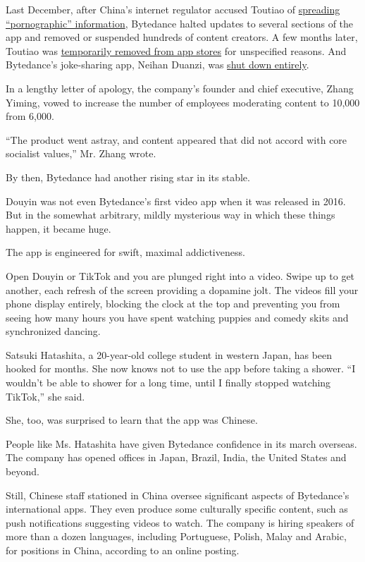 Last December, after China's internet regulator accused Toutiao of
\href{https://www.nytimes3xbfgragh.onion/2018/01/02/business/china-toutiao-censorship.html}{spreading
``pornographic'' information}, Bytedance halted updates to several
sections of the app and removed or suspended hundreds of content
creators. A few months later, Toutiao was
\href{https://www.nytimes3xbfgragh.onion/2018/04/11/technology/china-toutiao-bytedance-censor.html}{temporarily
removed from app stores} for unspecified reasons. And Bytedance's
joke-sharing app, Neihan Duanzi, was
\href{https://www.nytimes3xbfgragh.onion/2018/04/12/business/china-bytedance-duanzi-censor.html}{shut
down entirely}.

In a lengthy letter of apology, the company's founder and chief
executive, Zhang Yiming, vowed to increase the number of employees
moderating content to 10,000 from 6,000.

``The product went astray, and content appeared that did not accord with
core socialist values,'' Mr. Zhang wrote.

By then, Bytedance had another rising star in its stable.

Douyin was not even Bytedance's first video app when it was released in
2016. But in the somewhat arbitrary, mildly mysterious way in which
these things happen, it became huge.

The app is engineered for swift, maximal addictiveness.

Open Douyin or TikTok and you are plunged right into a video. Swipe up
to get another, each refresh of the screen providing a dopamine jolt.
The videos fill your phone display entirely, blocking the clock at the
top and preventing you from seeing how many hours you have spent
watching puppies and comedy skits and synchronized dancing.

Satsuki Hatashita, a 20-year-old college student in western Japan, has
been hooked for months. She now knows not to use the app before taking a
shower. ``I wouldn't be able to shower for a long time, until I finally
stopped watching TikTok,'' she said.

She, too, was surprised to learn that the app was Chinese.

People like Ms. Hatashita have given Bytedance confidence in its march
overseas. The company has opened offices in Japan, Brazil, India, the
United States and beyond.

Still, Chinese staff stationed in China oversee significant aspects of
Bytedance's international apps. They even produce some culturally
specific content, such as push notifications suggesting videos to watch.
The company is hiring speakers of more than a dozen languages, including
Portuguese, Polish, Malay and Arabic, for positions in China, according
to an online posting.

